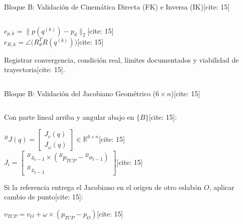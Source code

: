 \documentclass[aspectratio=169, xcolor={table,xcdraw}]{beamer}
\begin{document}
\begin{frame}{Bloque B: Validación de Cinemática Directa (FK) e Inversa (IK)[cite: 15]}
\begin{columns}[T]
\begin{column}{0.48\textwidth}
\begin{tcolorbox}[colback=white, colframe=ucbblue, title=\textbf{2. Cinemática Inversa (IK)} {[cite: 15]}, boxsep=0.8mm, top=1mm, bottom=1mm]
                \begin{center}
                    $\boxed{ e_{p,k} = \|p(q^{(k)}) - p_d\|_2 }$[cite: 15] \\[5pt]
                    $\boxed{ e_{R,k} = \angle\big(R_d^T R(q^{(k)})\big) }$[cite: 15]
                \end{center}
                Registrar convergencia, condición real, límites documentados y viabilidad de trayectoria[cite: 15].
            \end{tcolorbox}
        \end{column}
    \end{columns}
\end{frame}

\begin{frame}{Bloque B: Validación del Jacobiano Geométrico ($6 \times n$)[cite: 15]}
    \begin{columns}[T]
        \begin{column}{0.48\textwidth}
            \begin{tcolorbox}[colback=white, colframe=ucbblue, title=\textbf{Estructura y Cambio de Punto} {[cite: 15]}, boxsep=0.8mm, top=1mm, bottom=1mm]
                \scriptsize\raggedright
                Con parte lineal arriba y angular abajo en $\{B\}$[cite: 15]:
                \begin{center}
                    ${}^BJ(q) = \begin{bmatrix} J_v(q) \\ J_\omega(q) \end{bmatrix} \in \mathbb{R}^{6 \times n}$[cite: 15] \\[4pt]
                    $\boxed{ J_i = \begin{bmatrix} {}^Bz_{i-1} \times ({}^Bp_{TCP} - {}^Bo_{i-1}) \\ {}^Bz_{i-1} \end{bmatrix} }$[cite: 15]
                \end{center}
                Si la referencia entrega el Jacobiano en el origen de otro eslabón $O$, aplicar cambio de punto[cite: 15]:
                \begin{center}
                    $\boxed{ v_{TCP} = v_O + \omega \times (p_{TCP} - p_O) }$[cite: 15]
                \end{center}
            \end{tcolorbox}
        \end{column}
        \begin{column}{0.48\textwidth}

\end{column}
\end{columns}
\end{frame}
\end{document}
